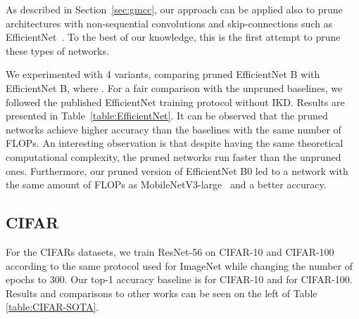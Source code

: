 \documentclass{article}
\begin{document}
As described in Section~\ref{sec:gmcc}, our approach can be applied also to prune architectures with non-sequential convolutions and skip-connections such as 
EfficientNet~\cite{EfficientNet}.
To the best of our knowledge, this is the first attempt to prune these types of networks. 



We experimented with 4 variants, comparing pruned EfficientNet B with EfficientNet B, where .
For a fair comparison with the unpruned baselines, we followed the published EfficientNet training protocol without IKD. Results are presented in Table~\ref{table:EfficientNet}.
It can be observed that the pruned networks achieve higher accuracy than the baselines with the same number of FLOPs.
An interesting observation is that despite having the same theoretical computational complexity, the pruned networks run faster than the unpruned ones. 
Furthermore, our pruned version of EfficientNet B0 led to a network with the same amount of FLOPs as MobileNetV3-large~\cite{mobilenetv3} and a better accuracy.
\vspace{-10pt}
\subsection{CIFAR}
\vspace{-5pt}
For the CIFARs datasets, we train ResNet-56 on CIFAR-10 and CIFAR-100 according to the same protocol used for ImageNet while changing the number of epochs to 300. 
Our top-1 accuracy baseline is  for CIFAR-10 and  for CIFAR-100. Results and comparisons to other works can be seen on the left of Table \ref{table:CIFAR-SOTA}.
\end{document}
